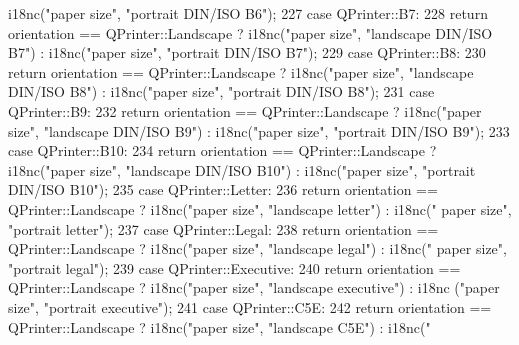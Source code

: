 \begin{DoxyCode}
      i18nc(\textcolor{stringliteral}{"paper size"}, \textcolor{stringliteral}{"portrait DIN/ISO B6"});
227         \textcolor{keywordflow}{case} QPrinter::B7:
228             \textcolor{keywordflow}{return}  orientation == QPrinter::Landscape ? i18nc(\textcolor{stringliteral}{"paper size"}, \textcolor{stringliteral}{"landscape DIN/ISO B7"}) : 
      i18nc(\textcolor{stringliteral}{"paper size"}, \textcolor{stringliteral}{"portrait DIN/ISO B7"});
229         \textcolor{keywordflow}{case} QPrinter::B8:
230             \textcolor{keywordflow}{return}  orientation == QPrinter::Landscape ? i18nc(\textcolor{stringliteral}{"paper size"}, \textcolor{stringliteral}{"landscape DIN/ISO B8"}) : 
      i18nc(\textcolor{stringliteral}{"paper size"}, \textcolor{stringliteral}{"portrait DIN/ISO B8"});
231         \textcolor{keywordflow}{case} QPrinter::B9:
232             \textcolor{keywordflow}{return}  orientation == QPrinter::Landscape ? i18nc(\textcolor{stringliteral}{"paper size"}, \textcolor{stringliteral}{"landscape DIN/ISO B9"}) : 
      i18nc(\textcolor{stringliteral}{"paper size"}, \textcolor{stringliteral}{"portrait DIN/ISO B9"});
233         \textcolor{keywordflow}{case} QPrinter::B10:
234             \textcolor{keywordflow}{return}  orientation == QPrinter::Landscape ? i18nc(\textcolor{stringliteral}{"paper size"}, \textcolor{stringliteral}{"landscape DIN/ISO B10"}) : 
      i18nc(\textcolor{stringliteral}{"paper size"}, \textcolor{stringliteral}{"portrait DIN/ISO B10"});
235         \textcolor{keywordflow}{case} QPrinter::Letter:
236             \textcolor{keywordflow}{return}  orientation == QPrinter::Landscape ? i18nc(\textcolor{stringliteral}{"paper size"}, \textcolor{stringliteral}{"landscape letter"}) : i18nc(\textcolor{stringliteral}{"
      paper size"}, \textcolor{stringliteral}{"portrait letter"});
237         \textcolor{keywordflow}{case} QPrinter::Legal:
238             \textcolor{keywordflow}{return}  orientation == QPrinter::Landscape ? i18nc(\textcolor{stringliteral}{"paper size"}, \textcolor{stringliteral}{"landscape legal"}) : i18nc(\textcolor{stringliteral}{"
      paper size"}, \textcolor{stringliteral}{"portrait legal"});
239         \textcolor{keywordflow}{case} QPrinter::Executive:
240             \textcolor{keywordflow}{return}  orientation == QPrinter::Landscape ? i18nc(\textcolor{stringliteral}{"paper size"}, \textcolor{stringliteral}{"landscape executive"}) : i18nc
      (\textcolor{stringliteral}{"paper size"}, \textcolor{stringliteral}{"portrait executive"});
241         \textcolor{keywordflow}{case} QPrinter::C5E:
242             \textcolor{keywordflow}{return}  orientation == QPrinter::Landscape ? i18nc(\textcolor{stringliteral}{"paper size"}, \textcolor{stringliteral}{"landscape C5E"}) : i18nc(\textcolor{stringliteral}{"
}
\end{DoxyCode}
